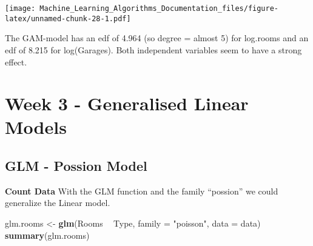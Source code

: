 \documentclass[
]{article}
\newenvironment{Shaded}{\begin{snugshade}}{\end{snugshade}}
\newcommand{\DataTypeTok}[1]{\textcolor[rgb]{0.13,0.29,0.53}{#1}}
\newcommand{\KeywordTok}[1]{\textcolor[rgb]{0.13,0.29,0.53}{\textbf{#1}}}
\newcommand{\NormalTok}[1]{#1}
\newcommand{\OperatorTok}[1]{\textcolor[rgb]{0.81,0.36,0.00}{\textbf{#1}}}
\newcommand{\StringTok}[1]{\textcolor[rgb]{0.31,0.60,0.02}{#1}}
\begin{document}
\texttt{[image: Machine\_Learning\_Algorithms\_Documentation\_files/figure-latex/unnamed-chunk-28-1.pdf]}

The GAM-model has an edf of 4.964 (so degree = almost 5) for log.rooms
and an edf of 8.215 for log(Garages). Both independent variables seem to
have a strong effect.

\hypertarget{week-3---generalised-linear-models}{%
\section{Week 3 - Generalised Linear
Models}\label{week-3---generalised-linear-models}}

\hypertarget{glm---possion-model}{%
\subsection{GLM - Possion Model}\label{glm---possion-model}}

\textbf{Count Data} With the GLM function and the family ``possion'' we
could generalize the Linear model.

\begin{Shaded}
\begin{Highlighting}[]
\NormalTok{glm.rooms <-}\StringTok{ }\KeywordTok{glm}\NormalTok{(Rooms }\OperatorTok{~}\StringTok{ }\NormalTok{Type, }\DataTypeTok{family =} \StringTok{"poisson"}\NormalTok{, }\DataTypeTok{data =}\NormalTok{ data)}
\KeywordTok{summary}\NormalTok{(glm.rooms)}
\end{Highlighting}
\end{Shaded}
\end{document}
